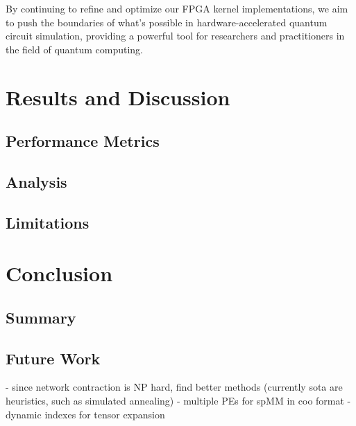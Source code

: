\documentclass[12pt,oneside,a4paper]{article}
\begin{document}
By continuing to refine and optimize our FPGA kernel implementations, we aim to push the boundaries of what's possible in hardware-accelerated quantum circuit simulation, providing a powerful tool for researchers and practitioners in the field of quantum computing.



\section{Results and Discussion}

\subsection{Performance Metrics}

\subsection{Analysis}

\subsection{Limitations}





\section{Conclusion}

\subsection{Summary}

\subsection{Future Work}
- since network contraction is NP hard, find better methods (currently sota are heuristics, such as simulated annealing)
- multiple PEs for spMM in coo format
- dynamic indexes for tensor expansion
\end{document}
